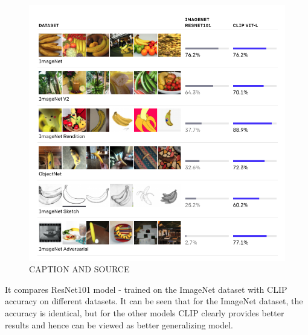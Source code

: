 \documentclass[12pt,a4paper,openany]{book}
\begin{document}
 \begin{figure}[ht!]
     \centering
     \includegraphics[scale=0.5]{figs/clip_summary.png}
     \caption{CAPTION AND SOURCE}
 \end{figure}
 \newpage
\noindent It compares ResNet101 model - trained on the ImageNet dataset with CLIP accuracy on different datasets.  It can be seen that for the ImageNet dataset, the accuracy is identical, but for the other models CLIP clearly provides better results and hence can be viewed as better generalizing model.
\newpage
\end{document}
